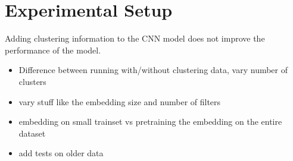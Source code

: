 \chapter{Experimental Setup}
\begin{nullhypothesis}
  Adding clustering information to the CNN model does not improve the
  performance of the model.
\end{nullhypothesis}
\begin{itemize}
  \item Difference between running with/without clustering data, vary number of clusters
  \item vary stuff like the embedding size and number of filters
  \item embedding on small trainset vs pretraining the embedding on the entire dataset
  \item add tests on older data
\end{itemize}

